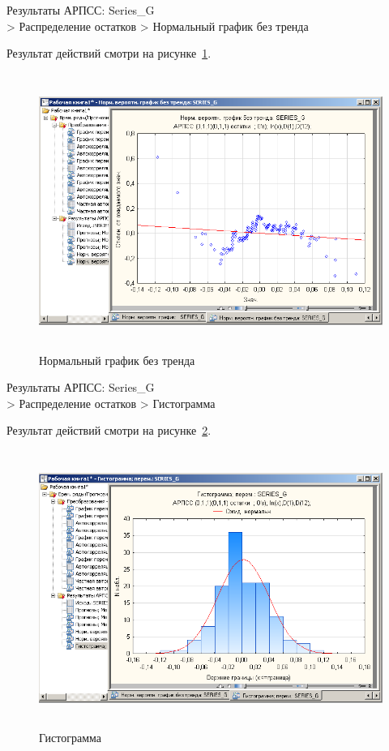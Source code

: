 
\newpage

Результаты АРПСС: Series\_G\\
> Распределение остатков
> Нормальный график без тренда

Результат действий смотри на рисунке~\ref{fig:18}.

\begin{figure}[!h]
  \centering

  \includegraphics[height=9cm]
  {inc/Series_G/18.PNG}

  \caption{Нормальный график без тренда}

  \label{fig:18}
\end{figure}

Результаты АРПСС: Series\_G\\
> Распределение остатков
> Гистограмма

Результат действий смотри на рисунке~\ref{fig:19}.

\begin{figure}[!h]
  \centering

  \includegraphics[height=9cm]
  {inc/Series_G/19.PNG}

  \caption{Гистограмма}

  \label{fig:19}
\end{figure}

